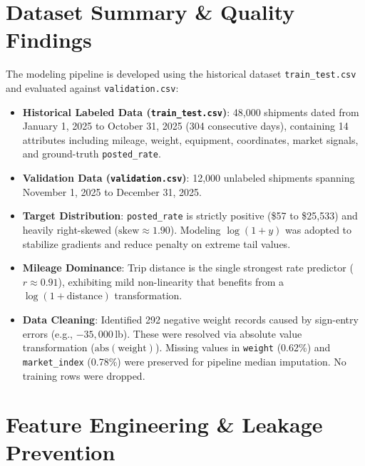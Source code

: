 \documentclass[11pt,a4paper]{article}
\begin{document}
\section{Dataset Summary \& Quality Findings}
The modeling pipeline is developed using the historical dataset \texttt{train\_test.csv} and evaluated against \texttt{validation.csv}:
\begin{itemize}
    \item \textbf{Historical Labeled Data (\texttt{train\_test.csv})}: 48,000 shipments dated from January 1, 2025 to October 31, 2025 (304 consecutive days), containing 14 attributes including mileage, weight, equipment, coordinates, market signals, and ground-truth \texttt{posted\_rate}.
    \item \textbf{Validation Data (\texttt{validation.csv})}: 12,000 unlabeled shipments spanning November 1, 2025 to December 31, 2025.
    \item \textbf{Target Distribution}: \texttt{posted\_rate} is strictly positive (\$57 to \$25,533) and heavily right-skewed ($\text{skew} \approx 1.90$). Modeling $\log(1 + y)$ was adopted to stabilize gradients and reduce penalty on extreme tail values.
    \item \textbf{Mileage Dominance}: Trip distance is the single strongest rate predictor ($r \approx 0.91$), exhibiting mild non-linearity that benefits from a $\log(1 + \text{distance})$ transformation.
    \item \textbf{Data Cleaning}: Identified 292 negative weight records caused by sign-entry errors (e.g., $-35,000$\,lb). These were resolved via absolute value transformation ($\text{abs}(\text{weight})$). Missing values in \texttt{weight} (0.62\%) and \texttt{market\_index} (0.78\%) were preserved for pipeline median imputation. No training rows were dropped.
\end{itemize}

\section{Feature Engineering \& Leakage Prevention}
\end{document}

